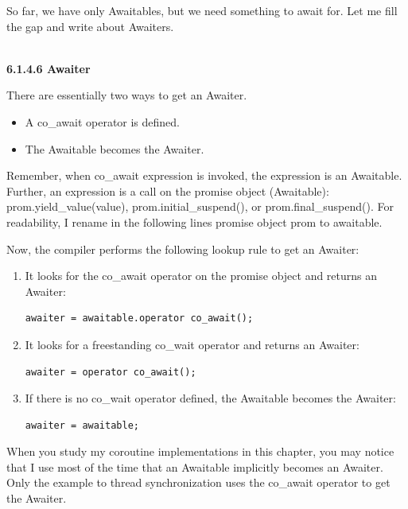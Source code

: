So far, we have only Awaitables, but we need something to await for. Let me fill the gap and write about Awaiters.

\hspace*{\fill} \\ %
\noindent
\textbf{6.1.4.6\hspace{0.2cm} Awaiter}

There are essentially two ways to get an Awaiter.

\begin{itemize}
\item 
A co\_await operator is defined.

\item 
The Awaitable becomes the Awaiter.
\end{itemize}

Remember, when co\_await expression is invoked, the expression is an Awaitable. Further, an expression is a call on the promise object (Awaitable): prom.yield\_value(value), prom.initial\_suspend(), or prom.final\_suspend(). For readability, I rename in the following lines promise object prom to awaitable.

Now, the compiler performs the following lookup rule to get an Awaiter:

\begin{enumerate}
\item 
It looks for the co\_await operator on the promise object and returns an Awaiter:
\begin{lstlisting}[style=styleCXX]
awaiter = awaitable.operator co_await();
\end{lstlisting}

\item 
It looks for a freestanding co\_wait operator and returns an Awaiter:
\begin{lstlisting}[style=styleCXX]
awaiter = operator co_await();
\end{lstlisting}

\item 
If there is no co\_wait operator defined, the Awaitable becomes the Awaiter:
\begin{lstlisting}[style=styleCXX]
awaiter = awaitable;
\end{lstlisting}
\end{enumerate}

\begin{tcolorbox}[colback=blue!5!white,colframe=blue!75!black,title={awaiter = awaitable}]
When you study my coroutine implementations in this chapter, you may notice that I use most of the time that an Awaitable implicitly becomes an Awaiter. Only the example to thread synchronization uses the co\_await operator to get the Awaiter.
\end{tcolorbox}

